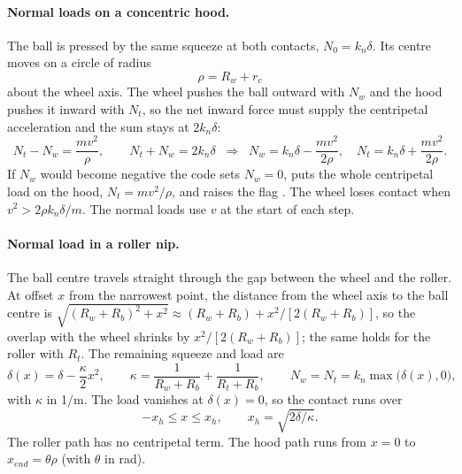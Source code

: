 \paragraph{Normal loads on a concentric hood.} The ball is pressed by the same squeeze at both contacts,
$N_0 = k_n\delta$. Its centre moves on a circle of radius
\begin{equation}
  \rho = R_w + r_c
  \label{eq:launcher-rho}
\end{equation}
about the wheel axis. The wheel pushes the ball outward with $N_w$ and the hood pushes it inward with $N_t$,
so the net inward force must supply the centripetal acceleration and the sum stays at $2k_n\delta$:
\begin{equation}
  N_t - N_w = \frac{m v^2}{\rho}, \qquad N_t + N_w = 2k_n\delta
  \;\;\Longrightarrow\;\;
  N_w = k_n\delta - \frac{m v^2}{2\rho}, \quad N_t = k_n\delta + \frac{m v^2}{2\rho}.
  \label{eq:launcher-Nhood}
\end{equation}
If $N_w$ would become negative the code sets $N_w = 0$, puts the whole centripetal load on the hood,
$N_t = m v^2/\rho$, and raises the flag . The wheel loses contact when
$v^2 > 2\rho k_n\delta/m$. The normal loads use $v$ at the start of each step.

\paragraph{Normal load in a roller nip.} The ball centre travels straight through the gap between the
wheel and the roller. At offset $x$ from the narrowest point, the distance from the wheel axis to the ball
centre is $\sqrt{(R_w+R_b)^2 + x^2} \approx (R_w+R_b) + x^2/[2(R_w+R_b)]$, so the overlap with the wheel
shrinks by $x^2/[2(R_w+R_b)]$; the same holds for the roller with $R_t$. The remaining squeeze and load are
\begin{equation}
  \delta(x) = \delta - \frac{\kappa}{2}x^2, \qquad
  \kappa = \frac{1}{R_w + R_b} + \frac{1}{R_t + R_b}, \qquad
  N_w = N_t = k_n \max\!\big(\delta(x),0\big),
  \label{eq:launcher-Nnip}
\end{equation}
with $\kappa$ in \unit{1/m}. The load vanishes at $\delta(x) = 0$, so the contact runs over
\begin{equation}
  -x_h \le x \le x_h, \qquad x_h = \sqrt{2\delta/\kappa}.
  \label{eq:launcher-xh}
\end{equation}
The roller path has no centripetal term. The hood path runs from $x=0$ to $x_{end} = \theta\rho$
(with $\theta$ in \unit{rad}).

